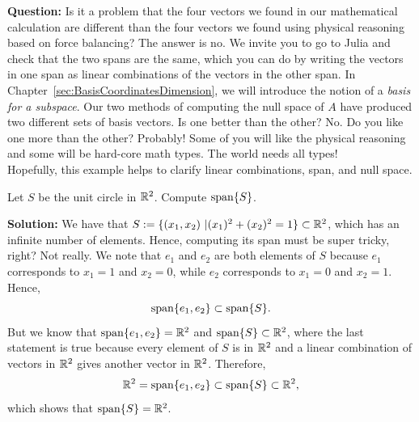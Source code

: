 \textbf{Question:} Is it a problem that the four vectors we found in our mathematical calculation are different than the four vectors we found using physical reasoning based on force balancing? The answer is no. We invite you to go to Julia and check that the two spans are the same, which you can do by writing the vectors in one span as linear combinations of the vectors in the other span. In Chapter~\ref{sec:BasisCoordinatesDimension}, we will introduce the notion of a \textit{basis for a subspace}. Our two methods of computing the null space of $A$ have produced two different sets of basis vectors. Is one better than the other? No. Do you like one more than the other? Probably! Some of you will like the physical reasoning and some will be hard-core math types. The world needs all types! \\


Hopefully, this example helps to clarify  linear combinations, span, and null space.
\Qed

\vspace*{0.2cm}

\begin{example}
\label{ex:SpanCircle} Let $S$ be the unit circle in $\mathbb R^2$. Compute $\mathrm{span} \{ S \}$. 
 \end{example}

\textbf{Solution:} We have that $S:=\{(x_1,x_2)~| (x_1)^2 + (x_2)^2=1  \} \subset \mathbb R^2$, which has an infinite number of elements. Hence, computing its span must be super tricky, right? Not really. We note that $e_1$ and $e_2$ are both elements of $S$ because $e_1$ corresponds to $x_1=1$ and $x_2=0$, while $e_2$ corresponds to $x_1=0$ and $x_2=1$. Hence,
$$\mathrm{span} \{ e_1,e_2 \} \subset \mathrm{span} \{ S \}.  $$
But we know that $\mathrm{span} \{ e_1,e_2 \} = \mathbb R^2$ and $\mathrm{span} \{ S \} \subset \mathbb R^2$, where the last statement is true because every element of $S$ is in $\mathbb R^2$ and a linear combination of vectors in $\mathbb R^2$ gives another vector in $\mathbb R^2$. Therefore,
$$ \mathbb R^2 = \mathrm{span} \{ e_1,e_2 \} \subset \mathrm{span} \{ S \}  \subset \mathbb R^2,$$
which shows that $\mathrm{span} \{ S \}  = \mathbb R^2$.
\Qed





